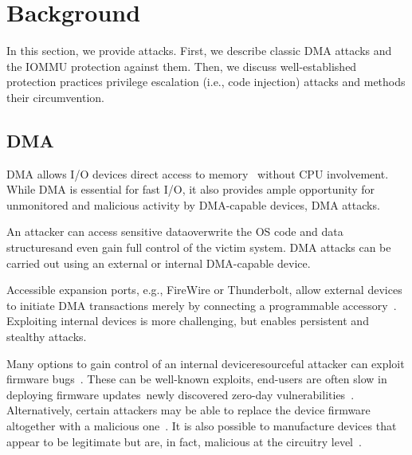 \section{Background}\label{sec:background}

In this section, we provide \DIFdelbegin {}\DIFdelend \DIFaddbegin {}\DIFaddend attacks. First, we describe classic DMA attacks and the IOMMU protection against them. Then, we discuss well-established protection practices \DIFdelbegin {}\DIFdelend \DIFaddbegin {}\DIFaddend privilege escalation (i.e., code injection) attacks and methods \DIFdelbegin {}\DIFdelend \DIFaddbegin {}\DIFaddend their circumvention.

\subsection{DMA \DIFdelbegin {}\DIFdelend \DIFaddbegin {}\DIFaddend }

DMA allows I/O devices direct access to memory~\cite{oC54} without CPU involvement. While DMA is essential for fast I/O, it also provides ample opportunity for unmonitored and malicious activity by DMA-capable devices, \DIFdelbegin {}\DIFdelend \DIFaddbegin {}\DIFaddend DMA attacks. 

An attacker can access sensitive data\DIFdelbegin {}\DIFdelend \DIFaddbegin \DIFadd{, }\DIFaddend overwrite the OS code and data structures\DIFaddbegin \DIFadd{, }\DIFaddend and even gain full control of the victim system. DMA attacks can be carried out using an external or internal DMA-capable device. 

Accessible expansion ports, e.g., FireWire or Thunderbolt, allow external devices to initiate DMA transactions merely by connecting a programmable accessory~\cite{Dor04, Vol, MM, thunder}. 
Exploiting internal devices is more challenging, but enables persistent and stealthy attacks. 

Many options \DIFaddbegin {}\DIFaddend to gain control of an internal device\DIFdelbegin {}\DIFdelend \DIFaddbegin {}\DIFaddend resourceful attacker can exploit firmware bugs~\cite{SB12}. These can be well-known exploits, \DIFdelbegin {}\DIFdelend \DIFaddbegin {}\DIFaddend end-users are often slow in deploying firmware updates~\cite{DPVL10}\DIFdelbegin {}\DIFdelend \DIFaddbegin {}\DIFaddend newly discovered zero-day vulnerabilities~\cite{Ben17b}. Alternatively, certain attackers may be able to replace the device firmware altogether with a malicious one~\cite{ZKB13, NL14}. It is also possible to manufacture devices that appear to be legitimate but are, in fact, malicious at the circuitry level~\cite{YHD16}.

